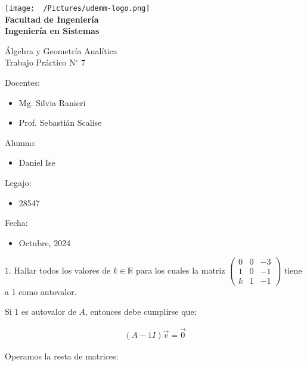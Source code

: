 \documentclass[12pt]{article}
\begin{document}
\thispagestyle{empty}

\begin{center}
	\vspace*{.5cm}
	\texttt{[image: ~/Pictures/udemm-logo.png]}\\
	\vspace{.2cm}
	\Large
	\textbf{Facultad de Ingeniería}\\
	\textbf{Ingeniería en Sistemas}\\
	\vspace{2cm}

	\Huge
	Álgebra y Geometría Analítica\\
	Trabajo Práctico N\(^\circ\) 7\\
	\vfill

	\raggedright
	\Large
	Docentes:
	\begin{itemize}
		\item[] Mg. Silvia Ranieri 		\\
		\item[] Prof. Sebastián Scalise \\
	\end{itemize}
	Alumno:
	\begin{itemize}
		\item[] Daniel Ise
	\end{itemize}
	Legajo:
	\begin{itemize}
		\item[] 28547
	\end{itemize}
	Fecha:
	\begin{itemize}
		\item[] Octubre, 2024
	\end{itemize}
\end{center}

\pagebreak

1. Hallar todos los valores de \(k \in \mathbb{R}\) para los cuales la matriz
\(\begin{pmatrix}
	0 & 0 & -3 \\1&0&-1\\k&1&-1
\end{pmatrix}\) tiene a 1 como autovalor.

Si 1 es autovalor de \(A\), entonces debe cumplirse que:

\begin{align*}
	(A-1I)\vec{v}=\vec{0}
\end{align*}

Operamos la resta de matrices:
\end{document}
